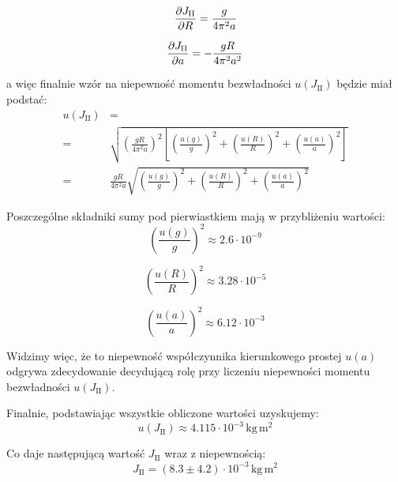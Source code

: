 \documentclass[twocolumn, a4paper, polish, 10pt]{article}
\begin{document}
\begin{displaymath}
    \pdv{J_{\mathrm{II}}}{R} = \frac{g}{4 \pi^2 a}
\end{displaymath}

\begin{displaymath}
    \pdv{J_{\mathrm{II}}}{a} = -\frac{g R}{4 \pi^2 a^2}
\end{displaymath}

a więc finalnie wzór na niepewność momentu bezwładności $u(J_{\mathrm{II}})$ będzie miał podstać:
\begin{equation}
\begin{split}
    u(J_{\mathrm{II}}) &= \\
    =& \sqrt{
        ( \frac{g R}{4 \pi^2 a} )^2 [
            ( \frac{u(g)}{g} )^2
            + ( \frac{u(R)}{R} )^2
            + ( \frac{u(a)}{a} )^2
        ]
    } \\
    =& \frac{g R}{4 \pi^2 a} \sqrt{
        ( \frac{u(g)}{g} )^2
        + ( \frac{u(R)}{R} )^2
        + ( \frac{u(a)}{a} )^2
    }
\end{split}
\end{equation}

Poszczególne składniki sumy pod pierwiastkiem mają w przybliżeniu wartości:
\begin{displaymath}
    ( \frac{u(g)}{g} )^2 \approx 2.6 \cdot 10^{-9}
\end{displaymath}

\begin{displaymath}
    ( \frac{u(R)}{R} )^2 \approx 3.28 \cdot 10^{-5}
\end{displaymath}

\begin{displaymath}
    ( \frac{u(a)}{a} )^2 \approx 6.12 \cdot 10^{-3}
\end{displaymath}

Widzimy więc, że to niepewność współczynnika kierunkowego prostej $u(a)$ odgrywa zdecydowanie decydującą rolę przy liczeniu niepewności momentu bezwładności $u(J_{\mathrm{II}})$.

Finalnie, podstawiając wszystkie obliczone wartości uzyskujemy:
\begin{displaymath}
    u(J_{\mathrm{II}}) \approx 4.115 \cdot 10^{-3} \, \mathrm{kg \, m^2}
\end{displaymath}

Co daje następującą wartość $J_{\mathrm{II}}$ wraz z niepewnością:
\begin{displaymath}
    J_{\mathrm{II}} = (8.3 \pm 4.2) \cdot 10^{-3} \, \mathrm{kg \, m^2}
\end{displaymath}
\end{document}
